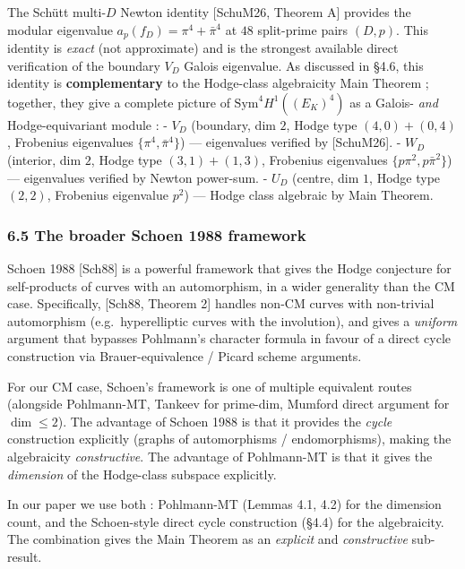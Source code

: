 \documentclass[
  11pt,
  a4paper,
]{amsart}
\begin{document}
The Schütt multi-\(D\) Newton identity {[}SchuM26, Theorem A{]} provides the modular eigenvalue \(a_p(f_D) = \pi^4 + \bar\pi^4\) at \(48\) split-prime pairs \((D, p)\). This identity is \emph{exact} (not approximate) and is the strongest available direct verification of the boundary \(V_D\) Galois eigenvalue. As discussed in §4.6, this identity is \textbf{complementary} to the Hodge-class algebraicity Main Theorem ; together, they give a complete picture of \(\mathrm{Sym}^4 H^1((E_K)^4)\) as a Galois- \emph{and} Hodge-equivariant module :
- \(V_D\) (boundary, dim \(2\), Hodge type \((4, 0) + (0, 4)\), Frobenius eigenvalues \(\{\pi^4, \bar\pi^4\}\)) --- eigenvalues verified by {[}SchuM26{]}.
- \(W_D\) (interior, dim \(2\), Hodge type \((3, 1) + (1, 3)\), Frobenius eigenvalues \(\{p\pi^2, p\bar\pi^2\}\)) --- eigenvalues verified by Newton power-sum.
- \(U_D\) (centre, dim \(1\), Hodge type \((2, 2)\), Frobenius eigenvalue \(p^2\)) --- Hodge class algebraic by Main Theorem.

\hypertarget{the-broader-schoen-1988-framework}{%
\subsubsection{6.5 The broader Schoen 1988 framework}\label{the-broader-schoen-1988-framework}}

Schoen 1988 {[}Sch88{]} is a powerful framework that gives the Hodge conjecture for self-products of curves with an automorphism, in a wider generality than the CM case. Specifically, {[}Sch88, Theorem 2{]} handles non-CM curves with non-trivial automorphism (e.g.~hyperelliptic curves with the involution), and gives a \emph{uniform} argument that bypasses Pohlmann's character formula in favour of a direct cycle construction via Brauer-equivalence / Picard scheme arguments.

For our CM case, Schoen's framework is one of multiple equivalent routes (alongside Pohlmann-MT, Tankeev for prime-dim, Mumford direct argument for \(\dim \leq 2\)). The advantage of Schoen 1988 is that it provides the \emph{cycle} construction explicitly (graphs of automorphisms / endomorphisms), making the algebraicity \emph{constructive}. The advantage of Pohlmann-MT is that it gives the \emph{dimension} of the Hodge-class subspace explicitly.

In our paper we use both : Pohlmann-MT (Lemmas 4.1, 4.2) for the dimension count, and the Schoen-style direct cycle construction (§4.4) for the algebraicity. The combination gives the Main Theorem as an \emph{explicit} and \emph{constructive} sub-result.
\end{document}

